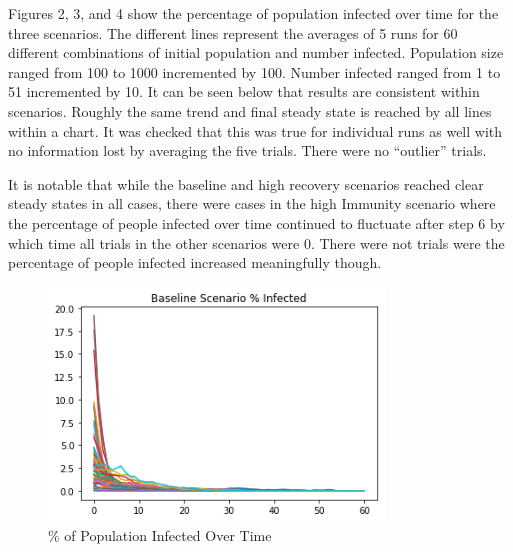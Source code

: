 \documentclass[11pt]{article} %
\begin{document}
Figures 2, 3, and 4 show the percentage of population infected over time for the three scenarios. The different lines represent the averages of 5 runs for 60 different combinations of initial population and number infected. Population size ranged from 100 to 1000 incremented by 100. Number infected ranged from 1 to 51 incremented by 10. It can be seen below that results are consistent within scenarios. Roughly the same trend and final steady state is reached by all lines within a chart. It was checked that this was true for individual runs as well with no information lost by averaging the five trials. There were no ``outlier'' trials. 

It is notable that while the baseline and high recovery scenarios reached clear steady states in all cases, there were cases in the high Immunity scenario where the percentage of people infected over time continued to fluctuate after step 6 by which time all trials in the other scenarios were 0. There were not trials were the percentage of people infected increased meaningfully though. 




\begin{figure}
\centering
\includegraphics[width=0.8\textwidth]{baseline_steady_state}
\caption{\% of Population Infected Over Time}
\end{figure}

\end{document}
